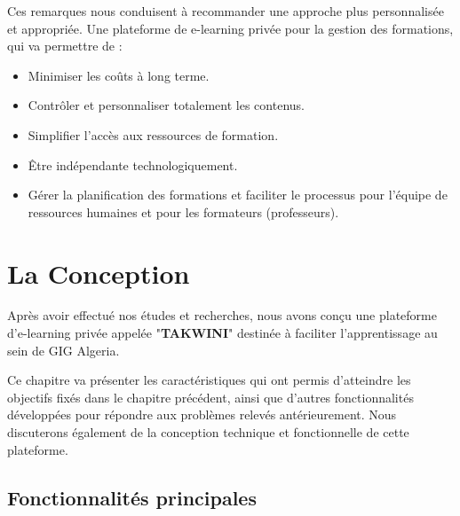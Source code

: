 \documentclass{article}
\begin{document}
 \noindent Ces remarques nous conduisent à recommander une approche plus personnalisée et appropriée.
Une plateforme de e-learning privée pour la gestion des formations, qui va permettre de : 
\begin{itemize}
    \item Minimiser les coûts à long terme.
    \item Contrôler et personnaliser totalement les contenus.
    \item Simplifier l'accès aux ressources de formation.
    \item Être indépendante technologiquement.
    \item Gérer la planification des formations et faciliter le processus pour l’équipe de ressources humaines et pour les formateurs (professeurs). 
\end{itemize}
\newpage
\section{La Conception}
\vspace{1cm}

\hspace*{2em}Après avoir effectué nos études et recherches, nous avons conçu une plateforme d’e-learning privée appelée "\textbf{TAKWINI}" destinée à faciliter l’apprentissage au sein de GIG Algeria.

\vspace{0,3cm}

\noindent Ce chapitre va présenter les caractéristiques qui ont permis d'atteindre les objectifs fixés dans le chapitre précédent, ainsi que d'autres fonctionnalités développées pour répondre aux problèmes relevés antérieurement. Nous discuterons également de la conception technique et fonctionnelle de cette plateforme.

\vspace{0,2cm}
\subsection{Fonctionnalités principales}
\end{document}
